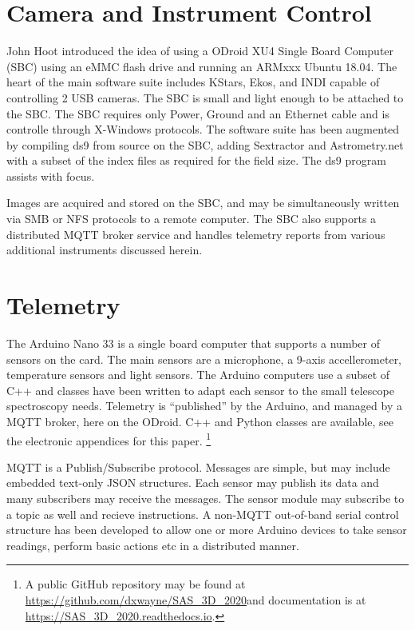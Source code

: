 \documentclass[letter,11pt,oneside]{article}
\newcommand{\ltodo}[2]{\marginpar{\textcolor{red}{ACTION: #1}\endnote{#2}}}
\newcommand{\github}{\url{https://github.com/dxwayne/SAS_3D_2020}}
\newcommand{\readthedocs}{\url{https://SAS_3D_2020.readthedocs.io}}
\begin{document}
\section{Camera and Instrument Control}

John Hoot \cite{} introduced the idea of using a ODroid XU4 Single
Board Computer (SBC) using an eMMC flash drive and running an ARMxxx
Ubuntu 18.04. The heart of the main software suite includes KStars,
Ekos, and INDI capable of controlling 2 USB cameras.  The SBC is small
and light enough to be attached to the SBC.  The SBC requires only
Power, Ground and an Ethernet cable and is controlle through X-Windows
protocols. The software suite has been augmented by compiling ds9
\cite{} from source on the SBC, adding Sextractor \cite{} and
Astrometry.net \cite{} with a subset of the index files as required
for the field size. The ds9 program assists with focus.

Images are acquired and stored on the SBC, and may be simultaneously
written via SMB or NFS protocols to a remote computer. The
SBC also supports a distributed MQTT broker service and handles
telemetry reports from various additional instruments discussed
herein.


\ltodo{XU4 Processor}{Get the description of ODroid together}

\section{Telemetry}

The Arduino Nano 33 is a single board computer that supports a number
of sensors on the card. The main sensors are a microphone, a 9-axis
accellerometer, temperature sensors and light sensors.  The Arduino
computers use a subset of C++ and classes have been written to adapt
each sensor to the small telescope spectroscopy needs. Telemetry is
``published'' by the Arduino, and managed by a MQTT broker, here on
the ODroid. C++ and Python classes are available, see the electronic
appendices for this paper. \footnote{A public GitHub repository may be
  found at \github and documentation is
  at \readthedocs.}

MQTT \cite{} is a Publish/Subscribe protocol. Messages are simple,
but may include embedded text-only JSON structures. Each sensor
may publish its data and many subscribers may receive the messages.
The sensor module may subscribe to a topic as well and recieve
instructions. A non-MQTT out-of-band serial control structure has
been developed to allow one or more Arduino devices to take sensor
readings, perform basic actions etc in a distributed manner.
\end{document}
